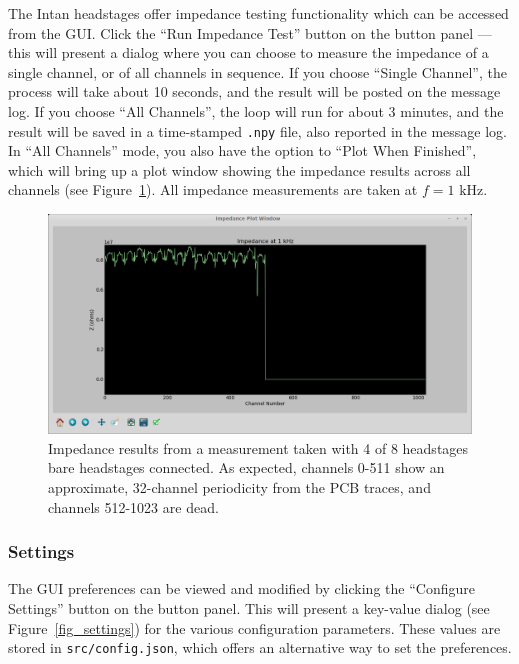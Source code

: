 The Intan headstages offer impedance testing functionality which can be accessed from the GUI. Click the ``Run Impedance Test'' button on the button panel --- this will present a dialog where you can choose to measure the impedance of a single channel, or of all channels in sequence. If you choose ``Single Channel'', the process will take about 10 seconds, and the result will be posted on the message log. If you choose ``All Channels'', the loop will run for about 3 minutes, and the result will be saved in a time-stamped \texttt{.npy} file, also reported in the message log. In ``All Channels'' mode, you also have the option to ``Plot When Finished'', which will bring up a plot window showing the impedance results across all channels (see Figure~\ref{fig_impedance}). All impedance measurements are taken at $f = 1\text{ kHz}$.

\begin{figure}[h!]
\begin{center}
\includegraphics[width=15cm]{screenshots/impedance.png}
\end{center}
\caption{Impedance results from a measurement taken with 4 of 8 headstages bare headstages connected. As expected, channels 0-511 show an approximate, 32-channel periodicity from the PCB traces, and channels 512-1023 are dead.}
\label{fig_impedance}
\end{figure}

\subsubsection{Settings}
\label{sec_usage_buttonpanel_settings}

The GUI preferences can be viewed and modified by clicking the ``Configure Settings'' button on the button panel. This will present a key-value dialog (see Figure~\ref{fig_settings}) for the various configuration parameters. These values are stored in \texttt{src/config.json}, which offers an alternative way to set the preferences.

